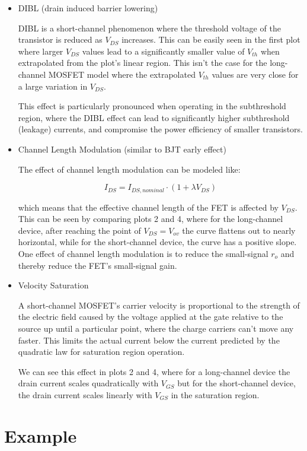 \documentclass[11pt]{article}
\begin{document}
\begin{itemize}
	\item DIBL (drain induced barrier lowering)
	
	DIBL is a short-channel phenomenon where the threshold voltage of the transistor is reduced as $V_{DS}$ increases. This can be easily seen in the first plot where larger $V_{DS}$ values lead to a significantly smaller value of $V_{th}$ when extrapolated from the plot's linear region. This isn't the case for the long-channel MOSFET model where the extrapolated $V_{th}$ values are very close for a large variation in $V_{DS}$.
	
	This effect is particularly pronounced when operating in the subthreshold region, where the DIBL effect can lead to significantly higher subthreshold (leakage) currents, and compromise the power efficiency of smaller transistors.

	\item Channel Length Modulation (similar to BJT early effect)
	
	The effect of channel length modulation can be modeled like:
	
	\begin{equation*}
		I_{DS} = I_{DS, nominal} \cdot (1 + \lambda V_{DS}) 
	\end{equation*} 
	
	which means that the effective channel length of the FET is affected by $V_{DS}$. This can be seen by comparing plots 2 and 4, where for the long-channel device, after reaching the point of $V_{DS} = V_{ov}$ the curve flattens out to nearly horizontal, while for the short-channel device, the curve has a positive slope. One effect of channel length modulation is to reduce the small-signal $r_o$ and thereby reduce the FET's small-signal gain.
	
	\item Velocity Saturation
	
	A short-channel MOSFET's carrier velocity is proportional to the strength of the electric field caused by the voltage applied at the gate relative to the source up until a particular point, where the charge carriers can't move any faster. This limits the actual current below the current predicted by the quadratic law for saturation region operation.
	
	We can see this effect in plots 2 and 4, where for a long-channel device the drain current scales quadratically with $V_{GS}$ but for the short-channel device, the drain current scales linearly with $V_{GS}$ in the saturation region.

\end{itemize}

\newpage
\appendix
\section{Example} \label{ex}
\end{document}
